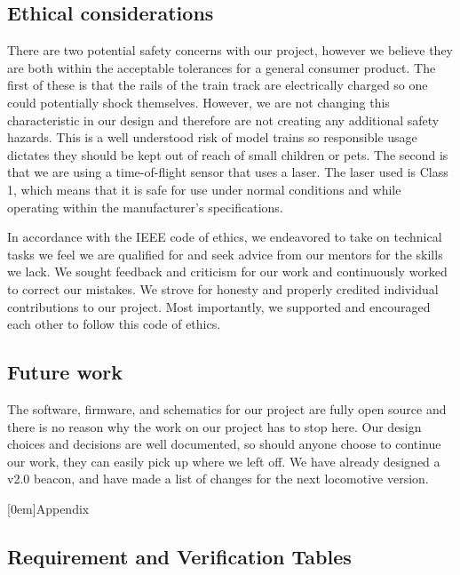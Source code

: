 \documentclass[openbib,letterpaper,10pt]{article}
\newcommand{\setappenstyle}{
	\titleformat{\section}{\color{titlecolor}\Large\bf}{\color{titlecolor}Appendix \Alph{section}}{0.8em}{}
	\titlecontents{section}[0em]{}{Appendix \thecontentslabel \hspace{1em}}{}{\titlerule*[0.5pc]{.}\contentspage}
}
\begin{document}
\begin{spacing}{1.15}
\subsection{Ethical considerations}
There are two potential safety concerns with our project, however we believe they are both within the acceptable tolerances for a general consumer product. The first of these is that the rails of the train track are electrically charged so one could potentially shock themselves. However, we are not changing this characteristic in our design and therefore are not creating any additional safety hazards. This is a well understood risk of model trains so responsible usage dictates they should be kept out of reach of small children or pets. The second is that we are using a time-of-flight sensor that uses a laser. The laser used is Class 1, which means that it is safe for use under normal conditions and while operating within the manufacturer's specifications\cite{VL6180X}.\par

In accordance with the IEEE code of ethics, we endeavored to take on technical tasks we feel we are qualified for and seek advice from our mentors for the skills we lack. We sought feedback and criticism for our work and continuously worked to correct our mistakes. We strove for honesty and properly credited individual contributions to our project. Most importantly, we supported and encouraged each other to follow this code of ethics.

\subsection{Future work}
The software, firmware, and schematics for our project are fully open source and there is no reason why the work on our project has to stop here. Our design choices and decisions are well documented, so should anyone choose to continue our work, they can easily pick up where we left off. We have already designed a v2.0 beacon, and have made a list of changes for the next locomotive version.

\clearpage



\clearpage
\setappenstyle
\begin{appendix}
\section{Requirement and Verification Tables}


\end{appendix}
\end{spacing}
\end{document}
